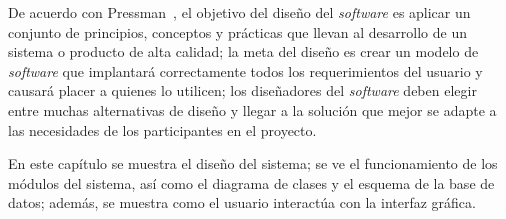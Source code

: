 De acuerdo con Pressman~\cite{pressman_software_2005}, el objetivo del diseño del \textit{software} es aplicar un conjunto de principios, conceptos y prácticas que llevan al desarrollo de un sistema o producto de alta calidad; la meta del diseño es crear un modelo de \textit{software} que implantará correctamente todos los requerimientos del usuario y causará placer a quienes lo utilicen; los diseñadores del \textit{software} deben elegir entre muchas alternativas de diseño y llegar a la solución que mejor se adapte a las necesidades de
los participantes en el proyecto.


En este capítulo se muestra el diseño del sistema; se ve el funcionamiento de los módulos del sistema, así como el diagrama de clases y el esquema de la base de datos; además, se muestra como el usuario interactúa con la interfaz gráfica.






